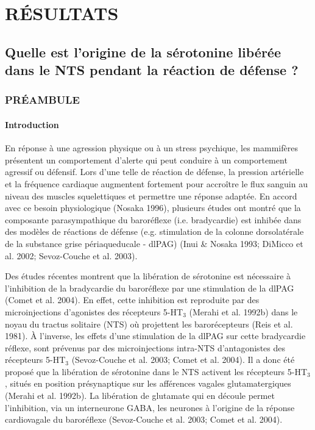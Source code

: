 \documentclass[a4paper,12pt,twoside]{report}
\begin{document}
\part{RÉSULTATS}

\cleardoublepage

\chapter{Quelle est l’origine de la sérotonine libérée dans le NTS pendant la réaction de défense ?}

\section{PRÉAMBULE}

\subsection{Introduction}

En réponse à une agression physique ou à un stress psychique, les mammifères présentent un comportement d’alerte qui peut conduire à un comportement agressif ou défensif. Lors d’une telle de réaction de défense, la pression artérielle et la fréquence cardiaque augmentent fortement pour accroître le flux sanguin au niveau des muscles squelettiques et permettre une réponse adaptée. En accord avec ce besoin physiologique (Nosaka 1996), plusieurs études ont montré que la composante parasympathique du baroréflexe (i.e. bradycardie) est inhibée dans des modèles de réactions de défense (e.g. stimulation de la colonne dorsolatérale de la substance grise périaqueducale - dlPAG) (Inui \& Nosaka 1993; DiMicco et al. 2002; Sevoz-Couche et al. 2003). 

Des études récentes montrent que la libération de sérotonine est nécessaire à l’inhibition de la bradycardie du baroréflexe par une stimulation de la dlPAG (Comet et al. 2004). En effet, cette inhibition est reproduite par des microinjections d’agonistes des récepteurs 5-HT$_{3}$ (Merahi et al. 1992b) dans le noyau du tractus solitaire (NTS) où projettent les barorécepteurs (Reis et al. 1981). À l’inverse, les effets d’une stimulation de la dlPAG sur cette bradycardie réflexe, sont prévenus par des microinjections intra-NTS d’antagonistes des récepteurs 5-HT$_{3}$ (Sevoz-Couche et al. 2003; Comet et al. 2004). Il a donc été proposé que la libération de sérotonine dans le NTS activent les récepteurs 5-HT$_{3}$, situés en position présynaptique sur les afférences vagales glutamatergiques (Merahi et al. 1992b). La libération de glutamate qui en découle permet l’inhibition, via un interneurone GABA, les neurones à l’origine de la réponse cardiovagale du baroréflexe (Sevoz-Couche et al. 2003; Comet et al. 2004).
\end{document}
